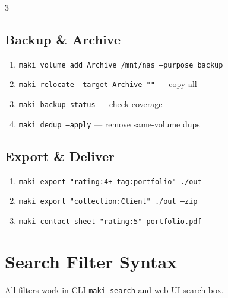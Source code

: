 \documentclass[a4paper,landscape,8pt]{article}
\newcommand{\cmd}[1]{\texttt{\footnotesize #1}}
\begin{document}
\begin{multicols}{3}
\subsection{Backup \& Archive}
\begin{enumerate}[leftmargin=1.5em]
\item \cmd{maki volume add Archive /mnt/nas --purpose backup}
\item \cmd{maki relocate --target Archive ""} — copy all
\item \cmd{maki backup-status} — check coverage
\item \cmd{maki dedup --apply} — remove same-volume dups
\end{enumerate}

\subsection{Export \& Deliver}
\begin{enumerate}[leftmargin=1.5em]
\item \cmd{maki export "rating:4+ tag:portfolio" ./out}
\item \cmd{maki export "collection:Client" ./out --zip}
\item \cmd{maki contact-sheet "rating:5" portfolio.pdf}
\end{enumerate}

\columnbreak

\section{Search Filter Syntax}

All filters work in CLI \cmd{maki search} and web UI search box.


\end{multicols}
\end{document}
